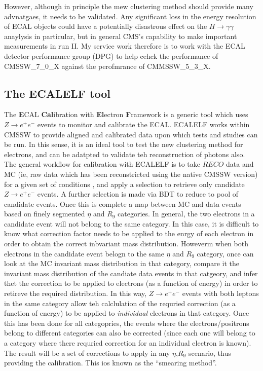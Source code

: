 \documentclass[10pt]{article}
\begin{document}
However, although in principle the mew clustering method should provide many advnatgaes, it needs to be validated. Any significant loss in the energy resolution of ECAL objects could have a potentially disastrous effect on the $H \rightarrow \gamma \gamma$ anaylysis in particular, but in general CMS's capability to make important measurements in run II. My service work therefore is to work with the ECAL detector performance group (DPG) to help cehck the performance of CMSSW\_7\_0\_X against the perofmrance of CMMSSW\_5\_3\_X. 

\subsection{The ECALELF tool}

The \textbf{E}CAL \textbf{Cal}ibration with \textbf{El}ectron \textbf{F}ramework is a generic tool which uses $Z \rightarrow e^+ e^-$ events to monitor and calibrate the ECAL. ECALELF works within CMSSW to provide aligned and calibrated data upon which tests and studies can be run. In this sense, it is an ideal tool to test the new clustering method for electrons, and can be adatpted to validate teh reconstruction of photons also. The general workflow for calibration with ECALELF is to take $RECO$ data and MC  (ie, raw data which has been reconstricted using the native CMSSW version) for a given set of conditions , and apply a selection to retrieve only candidate $Z \rightarrow e^+ e^-$ events. A further selection is made via  BDT to reduce to pool of candidate events. Once this is complete a map between MC and data events based on finely segmented $\eta$ and $R_9$ categories. In general, the two electrons in a candidate event will not belong to the same category. In this case, it is difficult to know what correction factor needs to be applied to the enrgy of each electron in order to obtain the correct inbvariant mass distribution. Howeverm when both electrons in the candidate event belogn to the same $\eta$ and $R_9$ category, once can look at the MC invariant mass distribution in that category, compare it the invariant mass distribution of the candiate data events in that catgeory, and infer thet the correction to be applied to electrons (as a function of energy) in order to retireve the required distribution. In this way, $Z \rightarrow e^+ e^-$ events with both leptons in the same category allow teh calclulation of the requried correction (as a function of energy) to be applied to \textit{individual} electrons in that category. Once this has been done for all categopries, the events where the electrons/positrons belong to different categories can also be corrected (since each one will belong to a category where there requried correction for an individual electron is known). The result will be a set of corrections to apply in any $\eta$,$R_9$ scenario, thus providing the calibration. This ios known as the ``smearing method''.
\end{document}
